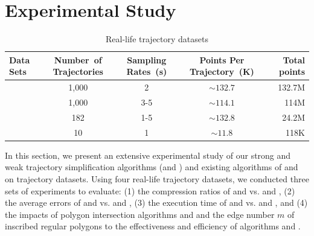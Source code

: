 \section{Experimental Study} %
\label{sec-exp}

\begin{table}[bt!]
	\caption{\small Real-life trajectory datasets}
	\vspace{-1ex}
	\centering
	\small
	\begin{tabular}{|l|c|c|c|r|}
		\hline
		\bf{ Data Sets}& \bf{Number\ of Trajectories}     &\bf {Sampling Rates\ (s)}   &\bf{Points Per Trajectory\ (K)}    &\bf {Total points} \\
		\hline
		\mopsi	&1,000	    &2	    &$\sim132.7$     &132.7M \\
		\hline
		\sercar	&1,000	    &3-5	    &$\sim114.1$   &114M\\
		\hline
		\geolife &182	    &1-5	    &$\sim132.8$   &24.2M\\
		\hline
		\pricar	& 10	    &1	        &$\sim11.8$      &118K \\
		\hline
	\end{tabular}
	\label{tab:datasets}
	\vspace{-2ex}
\end{table}


In this section, we present an extensive experimental study of our strong and weak trajectory simplification algorithms (\cist and \cista) and existing algorithms of \dps and \squishe on trajectory datasets.
Using four real-life trajectory datasets, we conducted three sets of experiments to evaluate:
(1) the compression ratios of \cist and \cista vs. \dps and \squishe,
(2) the average errors of \cist and \cista vs. \dps and \squishe,
(3) the execution time of \cist and \cista vs. \dps and \squishe, and
(4) the impacts of polygon intersection algorithms \rpia and \cpia and the edge number $m$ of inscribed regular polygons to the effectiveness and efficiency of algorithms \cist and \cista.


